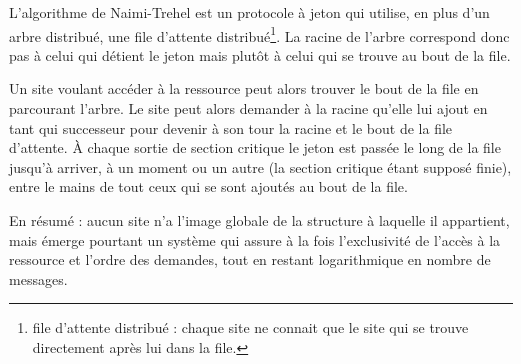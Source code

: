 L'algorithme de Naimi-Trehel est un protocole à jeton qui utilise, en plus d'un arbre distribué, une file d'attente distribué\footnote{file d'attente distribué : chaque site ne connait que le site qui se trouve directement après lui dans la file.}. La racine de l'arbre correspond donc pas à celui qui détient le jeton mais plutôt à celui qui se trouve au bout de la file.

Un site voulant accéder à la ressource peut alors trouver le bout de la file en parcourant l'arbre. Le site peut alors demander à la racine qu'elle lui ajout en tant qui successeur pour devenir à son tour la racine et le bout de la file d'attente. À chaque sortie de section critique le jeton est passée le long de la file jusqu'à arriver, à un moment ou un autre (la section critique étant supposé finie), entre le mains de tout ceux qui se sont ajoutés au bout de la file.

En résumé : aucun site n'a l'image globale de la structure à laquelle il appartient, mais émerge pourtant un système qui assure à la fois l'exclusivité de l'accès à la ressource et l'ordre des demandes, tout en restant logarithmique en nombre de messages.